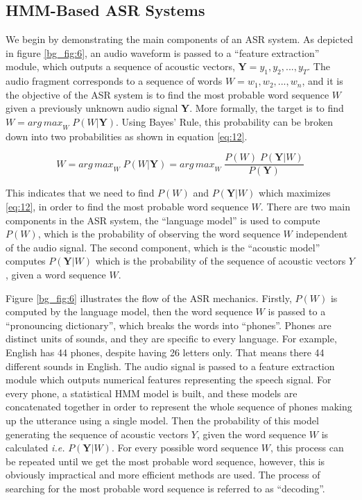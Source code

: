 \subsection{HMM-Based ASR Systems} 
\label{bg:s3_sub1}



We begin by demonstrating the main components of an \ac{ASR} system. As depicted in figure \ref{bg_fig:6}, an audio waveform is passed to a \enquote{feature extraction} module, which outputs a sequence of acoustic vectors, $\mathbf{Y} = y_1,y_2,...,y_T$. The audio fragment corresponds to a sequence of words $W = w_1,w_2,...,w_n$, and it is the objective of the \ac{ASR} system is to find the most probable word sequence $W$ given a previously unknown audio signal $\mathbf{Y}$.
More formally, the target is to find $W = {arg \, max}_{W} \; P(W|\mathbf{Y})$. Using Bayes' Rule, this probability can be broken down into two probabilities as shown in equation \ref{eq:12}.


\begin{equation}
\label{eq:12}
W = {arg \, max}_{W} \; P(W|\mathbf{Y}) = {arg \, max}_{W} \; \frac{P(W) \; P(\mathbf{Y}|W)}{P(\mathbf{Y})}
\end{equation}

This indicates that we need to find $P(W)$ and $P(\mathbf{Y}|W)$ which maximizes \ref{eq:12}, in order to find the most probable word sequence $W$.
There are two main components in the \ac{ASR} system, the \enquote{language model} is used to compute $P(W)$, which is the probability of observing the word sequence $W$ independent of the audio signal. The second component, which is the \enquote{acoustic model} computes $P(\mathbf{Y}|W)$ which is the probability of the sequence of acoustic vectors $Y$, given a word sequence $W$.

Figure \ref{bg_fig:6} illustrates the flow of the \ac{ASR} mechanics. Firstly, $P(W)$ is computed by the language model, then the word sequence $W$ is passed to a \enquote{pronouncing dictionary}, which breaks the words into \enquote{phones}. Phones are distinct units of sounds, and they are specific to every language. For example, English has 44 phones, despite having 26 letters only. That means there 44 different sounds in English. The audio signal is passed to a feature extraction module which outputs numerical features representing the speech signal. For every phone, a statistical \ac{HMM} model is built, and these models are concatenated together in order to represent the whole sequence of phones making up the utterance using a single model. Then the probability of this model generating the sequence of acoustic vectors $Y$, given the word sequence $W$ is calculated \textit{i.e.} $P(\mathbf{Y}|W)$. For every possible word sequence $W$, this process can be repeated until we get the most probable word sequence, however, this is obviously impractical and more efficient methods are used. The process of searching for the most probable word sequence is referred to as \enquote{decoding}.

